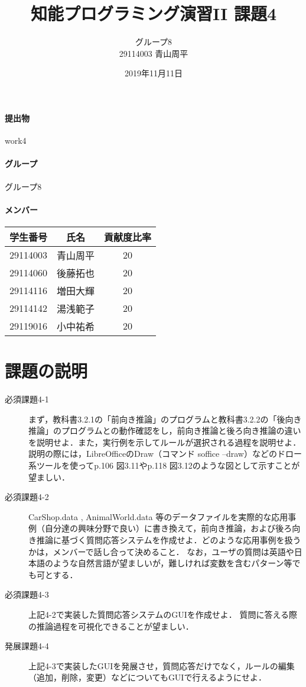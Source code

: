 \documentclass[12pt]{jarticle}
\title{知能プログラミング演習II 課題4}
\author{グループ8\\
  29114003 青山周平\\
}
\date{2019年11月11日}
\begin{document}
\maketitle

\paragraph{提出物} work4
\paragraph{グループ} グループ8
\paragraph{メンバー}
\begin{tabular}{|c|c|c|}
  \hline
  学生番号&氏名&貢献度比率\\
  \hline\hline
  29114003&青山周平&20\\
  \hline
  29114060&後藤拓也&20\\
  \hline
  29114116&増田大輝&20\\
  \hline
  29114142&湯浅範子&20\\
  \hline
  29119016&小中祐希&20\\
  \hline
\end{tabular}



\section{課題の説明}
\begin{description}
\item[必須課題4-1] まず，教科書3.2.1の「前向き推論」のプログラムと教科書3.2.2の「後向き推論」のプログラムとの動作確認をし，前向き推論と後ろ向き推論の違いを説明せよ．また，実行例を示してルールが選択される過程を説明せよ．説明の際には，LibreOfficeのDraw（コマンド soffice --draw）などのドロー系ツールを使ってp.106 図3.11やp.118 図3.12のような図として示すことが望ましい．
\item[必須課題4-2] CarShop.data , AnimalWorld.data 等のデータファイルを実際的な応用事例（自分達の興味分野で良い）に書き換えて，前向き推論，および後ろ向き推論に基づく質問応答システムを作成せよ．どのような応用事例を扱うかは，メンバーで話し合って決めること．
なお，ユーザの質問は英語や日本語のような自然言語が望ましいが，難しければ変数を含むパターン等でも可とする．
\item[必須課題4-3] 上記4-2で実装した質問応答システムのGUIを作成せよ．
質問に答える際の推論過程を可視化できることが望ましい．
\item[発展課題4-4] 上記4-3で実装したGUIを発展させ，質問応答だけでなく，ルールの編集（追加，削除，変更）などについてもGUIで行えるようにせよ．
\end{description}
\end{document}
